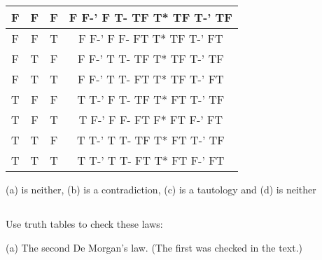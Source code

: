 \documentclass{article}
\begin{document}
\begin{enumerate}[label=(\alph*)]
\begin{center}
\begin{tabular}{||c c c c ||}
 \hline\hline
 F & F & F & F  F-' F  T- TF  T* TF  T-' TF\\ 
 \hline
 F & F & T & F  F-' F  F- FT  T* TF  T-' FT\\
 \hline
 F & T & F & F  F-' T  T- TF  T* TF  T-' TF\\
 \hline
 F & T & T & F  F-' T  T- FT  T* TF  T-' FT\\
 \hline
 T & F & F & T  T-' F  T- TF  T* FT  T-' TF\\
 \hline
 T & F & T & T  F-' F  F- FT  F* FT  F-' FT\\
 \hline
 T & T & F & T  T-' T  T- TF  T* FT  T-' TF\\
 \hline
 T & T & T & T  T-' T  T- FT  T* FT  F-' FT\\[1ex] 
 \hline
 \end{tabular}
 \end{center}
\end{enumerate}

(a) is neither, (b) is a contradiction, (c) is a tautology and (d) is neither
\subsection{}
Use truth tables to check these laws:

(a) The second De Morgan’s law. (The first was checked in the text.)
\end{document}
